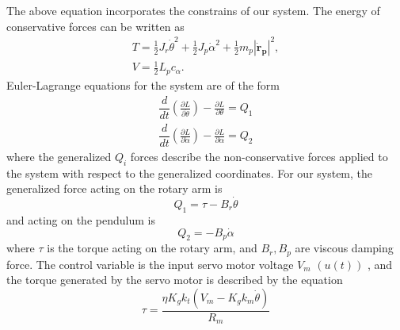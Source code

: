 \documentclass[superscriptaddress,floatfix,reprint,amssymb, amsmath,aps, pre]{revtex4-1}
\begin{document}
{{\begin{equation}
        \end{equation}
        The above equation incorporates the constrains of our system. The energy of conservative forces can be written as 
        \begin{gather}
            T = \frac{1}{2} J_r \dot \theta^2 + \frac{1}{2} J_p \dot \alpha^2 + \frac{1}{2} m_p |\mathbf{\dot r_p}|^2, \\
            V = \frac{1}{2} L_p c_\alpha .
        \end{gather}
        Euler-Lagrange equations for the system are of the form 
        \begin{gather}
            \dfrac{d}{dt}\left(\frac{\partial L}{\partial \dot \theta}\right) - \frac{\partial L}{\partial \theta} = Q_1 \\
            \dfrac{d}{dt}\left(\frac{\partial L}{\partial \dot \alpha}\right) - \frac{\partial L}{\partial \alpha} = Q_2
        \end{gather}
        where the generalized \(Q_i\) forces describe the non-conservative forces applied to the system with respect to the generalized coordinates. For our system, the generalized force acting on the rotary arm is 
        \begin{equation}
            Q_1 = \tau -B_r \dot \theta
        \end{equation}
        and acting on the pendulum is 
        \begin{equation}
            Q_2 = -B_p \dot \alpha
        \end{equation}
        where \(\tau\) is the torque acting on the rotary arm, and \(B_r,B_p\) are viscous damping force. The control variable is the input servo motor voltage \(V_m\) \((u(t))\) , and the torque generated by the servo motor is described by the equation \cite{gurocak_rotary_2017}
        \begin{equation}
            \tau = \frac{\eta K_g k_t(V_m - K_g k_m \dot \theta)}{R_m}
        \end{equation}

}}
\end{document}
